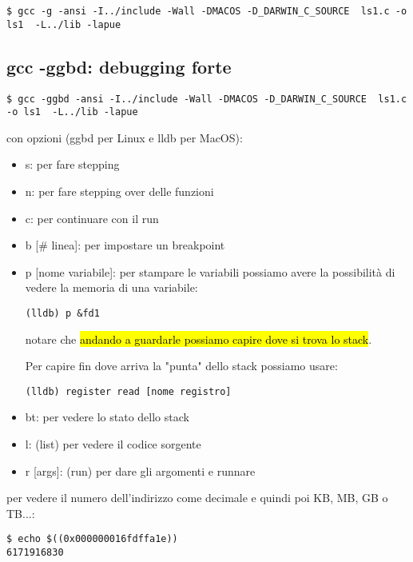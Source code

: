 \begin{lstlisting}
$ gcc -g -ansi -I../include -Wall -DMACOS -D_DARWIN_C_SOURCE  ls1.c -o ls1  -L../lib -lapue
\end{lstlisting}


\subsection{gcc -ggbd: debugging forte}

\begin{lstlisting}
$ gcc -ggbd -ansi -I../include -Wall -DMACOS -D_DARWIN_C_SOURCE  ls1.c -o ls1  -L../lib -lapue
\end{lstlisting}

con opzioni (ggbd per Linux e lldb per MacOS):
\begin{itemize}
    \item s: per fare stepping
    \item n: per fare stepping over delle funzioni
    \item c: per continuare con il run
    \item b [\# linea]: per impostare un breakpoint
    \item p [nome variabile]: per stampare le variabili
        possiamo avere la possibilità di vedere la memoria di una variabile: 

\begin{lstlisting}
(lldb) p &fd1
\end{lstlisting}

        notare che \hl{andando a guardarle possiamo capire dove si trova lo stack}. 

        Per capire fin dove arriva la "punta" dello stack possiamo usare:

\begin{lstlisting}
(lldb) register read [nome registro]
\end{lstlisting}

    \item bt: per vedere lo stato dello stack
    \item l: (list) per vedere il codice sorgente
    \item r [args]: (run) per dare gli argomenti e runnare
\end{itemize}

per vedere il numero dell'indirizzo come decimale e quindi poi KB, MB, GB o TB...:
\begin{lstlisting}
$ echo $((0x000000016fdffa1e))
6171916830
\end{lstlisting}

